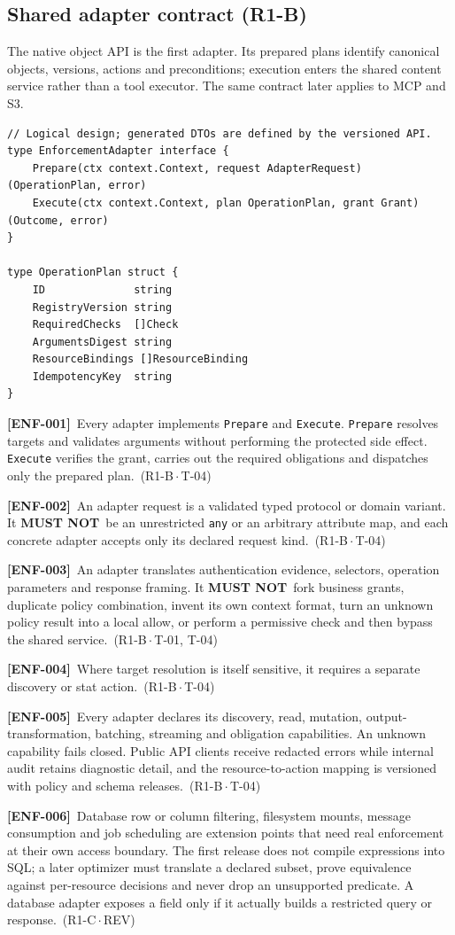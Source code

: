 \documentclass[11pt,a4paper]{article}
\newcommand{\mustnot}{\textbf{MUST NOT}}
\newcommand{\code}[1]{{\small\nolinkurl{#1}}}
\newcommand{\reqtag}[2]{{\footnotesize\color{accent}(#1\,$\cdot$\,#2)}}
\newcommand{\req}[4]{\par\noindent\hypertarget{req:#1}{\textbf{[#1]}}\ #4\ \reqtag{#2}{#3}\par}
\begin{document}
\subsection{Shared adapter contract (R1-B)}
The native object API is the first adapter. Its prepared plans identify canonical objects, versions, actions and preconditions; execution enters the shared content service rather than a tool executor. The same contract later applies to MCP and S3.
\begin{lstlisting}
// Logical design; generated DTOs are defined by the versioned API.
type EnforcementAdapter interface {
    Prepare(ctx context.Context, request AdapterRequest) (OperationPlan, error)
    Execute(ctx context.Context, plan OperationPlan, grant Grant) (Outcome, error)
}

type OperationPlan struct {
    ID              string
    RegistryVersion string
    RequiredChecks  []Check
    ArgumentsDigest string
    ResourceBindings []ResourceBinding
    IdempotencyKey  string
}
\end{lstlisting}
\req{ENF-001}{R1-B}{T-04}{Every adapter implements \code{Prepare} and \code{Execute}. \code{Prepare} resolves targets and validates arguments without performing the protected side effect. \code{Execute} verifies the grant, carries out the required obligations and dispatches only the prepared plan.}
\req{ENF-002}{R1-B}{T-04}{An adapter request is a validated typed protocol or domain variant. It \mustnot\ be an unrestricted \code{any} or an arbitrary attribute map, and each concrete adapter accepts only its declared request kind.}
\req{ENF-003}{R1-B}{T-01, T-04}{An adapter translates authentication evidence, selectors, operation parameters and response framing. It \mustnot\ fork business grants, duplicate policy combination, invent its own context format, turn an unknown policy result into a local allow, or perform a permissive check and then bypass the shared service.}
\req{ENF-004}{R1-B}{T-04}{Where target resolution is itself sensitive, it requires a separate discovery or stat action.}
\req{ENF-005}{R1-B}{T-04}{Every adapter declares its discovery, read, mutation, output-transformation, batching, streaming and obligation capabilities. An unknown capability fails closed. Public API clients receive redacted errors while internal audit retains diagnostic detail, and the resource-to-action mapping is versioned with policy and schema releases.}
\req{ENF-006}{R1-C}{REV}{Database row or column filtering, filesystem mounts, message consumption and job scheduling are extension points that need real enforcement at their own access boundary. The first release does not compile expressions into SQL; a later optimizer must translate a declared subset, prove equivalence against per-resource decisions and never drop an unsupported predicate. A database adapter exposes a field only if it actually builds a restricted query or response.}
\end{document}
